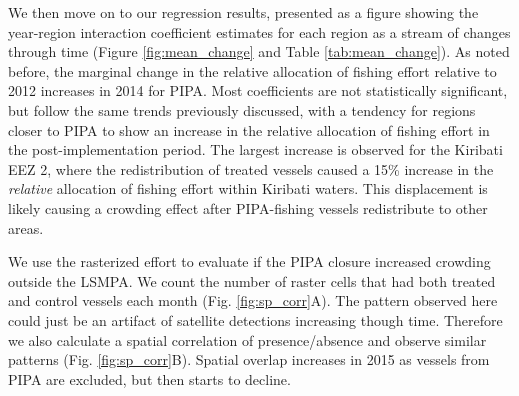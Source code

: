 \documentclass[9pttwoside,lineno]{pnas-new}
\begin{document}
We then move on to our regression results, presented as a figure showing
the year-region interaction coefficient estimates for each region as a
stream of changes through time (Figure \ref{fig:mean_change} and Table
\ref{tab:mean_change}). As noted before, the marginal change in the
relative allocation of fishing effort relative to 2012 increases in 2014
for PIPA. Most coefficients are not statistically significant, but
follow the same trends previously discussed, with a tendency for regions
closer to PIPA to show an increase in the relative allocation of fishing
effort in the post-implementation period. The largest increase is
observed for the Kiribati EEZ 2, where the redistribution of treated
vessels caused a 15\% increase in the \emph{relative} allocation of
fishing effort within Kiribati waters. This displacement is likely
causing a crowding effect after PIPA-fishing vessels redistribute to
other areas.

We use the rasterized effort to evaluate if the PIPA closure increased
crowding outside the LSMPA. We count the number of raster cells that
had both treated and control vessels each month (Fig.
\ref{fig:sp_corr}A). The pattern observed here could just be an artifact
of satellite detections increasing though time. Therefore we also
calculate a spatial correlation of presence/absence and observe similar
patterns (Fig. \ref{fig:sp_corr}B). Spatial overlap increases
in 2015 as vessels from PIPA are excluded, but then starts to decline.
\end{document}
